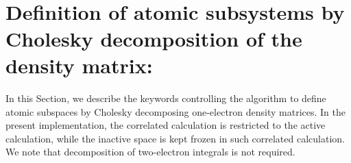 ~%
\section{Definition of atomic subsystems by Cholesky decomposition of 
the density matrix: }
\label{sec:choact}

In this Section, we describe the keywords controlling the algorithm to 
define atomic subspaces by Cholesky decomposing one-electron density 
matrices. In the present implementation, the correlated calculation
is restricted to the active calculation, while the inactive
space is kept frozen in such correlated calculation. We note that 
decomposition of two-electron integrals is not required.


\begin{center}
\end{center}

